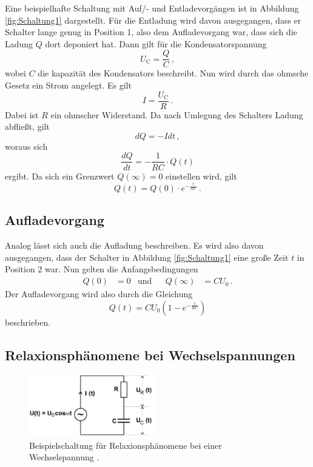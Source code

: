 Eine beispielhafte Schaltung mit Auf/- und Entladevorgängen ist in Abbildung \ref{fig:Schaltung1} dargestellt.
Für die Entladung wird davon ausgegangen, dass er Schalter lange genug in Position 1, also dem Aufladevorgang war,
dass sich die Ladung $Q$ dort deponiert hat.
Dann gilt für die Kondensatorspannung
\begin{equation}
    U_\text{C} = \frac{Q}{C} \, ,
\end{equation}
wobei $C$ die kapazität des Kondensators beschreibt.
Nun wird durch das ohmsche Gesetz ein Strom angelegt. Es gilt
\begin{equation}
    I = \frac{U_\text{C}}{R} \, .
\end{equation}
Dabei ist $R$ ein ohmscher Widerstand.
Da nach Umlegung des Schalters Ladung abfließt, gilt
\begin{equation*}
    dQ = -I dt \, ,
\end{equation*}
woraus sich 
\begin{equation*}
    \frac{dQ}{dt} = -\frac{1}{R C} \cdot Q(t)
\end{equation*}
ergibt. Da sich ein Grenzwert $Q(\infty) = 0$ einstellen wird, gilt
\begin{equation}
    Q(t) = Q(0) \cdot e^{- \frac{t}{R C}} \, .
\end{equation}

\subsection{Aufladevorgang}

Analog lässt sich auch die Aufladung beschreiben.
Es wird also davon ausgegangen, dass der Schalter in Abbildung \ref{fig:Schaltung1} eine große Zeit $t$ in
Position 2 war.
Nun gelten die Anfangsbedingungen
\begin{align*}
    Q(0) &= 0 & \text{und} & & Q(\infty) &= C U_0 \, .
\end{align*}
Der Aufladevorgang wird also durch die Gleichung 
\begin{equation}
    Q(t) = C U_0 (1 - e^{- \frac{t}{R C}})
\end{equation}
beschrieben.

\subsection{Relaxionsphänomene bei Wechselspannungen}
\begin{figure}
    \centering
    \includegraphics[width=0.5\textwidth]{pictures/Schaltung2.png}
    \caption{Beispielschaltung für Relaxionsphänomene bei einer Wechselspannung \cite[3]{v353}.}
    \label{fig:Schaltung2}
\end{figure}


